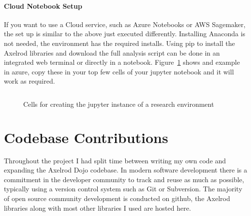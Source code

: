 \paragraph{Cloud Notebook Setup} 
If you want to use a Cloud service, such as Azure Notebooks or AWS Sagemaker, the set up is similar to the above just executed differently.
Installing Anaconda is not needed, the environment has the required installs.
Using pip to install the Axelrod libraries and download the full analysis script can be done in an integrated web terminal or directly in a notebook.
Figure~\ref{code:jupyterExample} shows and example in azure, copy these in your top few cells of your jupyter notebook and it will work as required.

\begin{figure}[ht]
    \inputminted{python}{code_snippets/jupyterCells.py}
    \caption{Cells for creating the jupyter instance of a research environment}\label{code:jupyterExample}
\end{figure}

\section{Codebase Contributions}
Throughout the project I had split time between writing my own code and expanding the Axelrod Dojo codebase. 
In modern software development there is a commitment in the developer community to track and reuse as much as possible, typically using a version control system such as Git or Subversion.
The majority of open source community development is conducted on github\cite{GitHub}, the Axelrod libraries along with most other libraries I used are hosted here.

